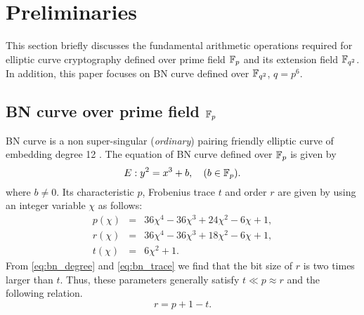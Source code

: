 \section{Preliminaries}
This section briefly discusses the fundamental arithmetic operations required for elliptic curve cryptography defined over prime field ${\mathbb{F}}_{p}$ and its extension field ${\mathbb{F}}_{q^{2}}$. In addition, this paper focuses on BN curve defined over ${\mathbb{F}}_{q^{2}}$, $q=p^6$.

\subsection{BN curve over prime field ${\mathbb{F}}_{p}$}
BN curve is a non\- super-singular (\textit{ordinary}) pairing friendly 
elliptic curve of embedding degree 12 \cite{EPRINT:FreScoTes06}. The equation of BN curve defined over ${\mathbb{F}}_{p}$ is given by 
\begin{equation}\label{eq:(BN_curve)}
E:y^2=x^3+b, \quad \mbox{($b \in {\mathbb{F}}_{p}$)}.
\end{equation}
where $b \neq 0$. Its characteristic $p$, Frobenius trace $t$ and order $r$ are given by using an integer variable $\chi$ as follows:
\begin{eqnarray}
p(\chi) & = & 36\chi^4-36\chi^3+24\chi^2-6\chi+1, \\
r(\chi) & = & 36\chi^4-36\chi^3+18\chi^2-6\chi+1,\label{eq:bn_degree}  \\
t(\chi) & = & 6\chi^2+1.\label{eq:bn_trace} 
\end{eqnarray} 
From \eqref{eq:bn_degree} and \eqref{eq:bn_trace} we find that the bit size of $r$ is two times larger than $t$. Thus, these parameters generally satisfy $t \ll p \approx r$ and the following relation.
\begin{equation}\label{eq:rpt_relation}
r = p+1-t.
\end{equation}

